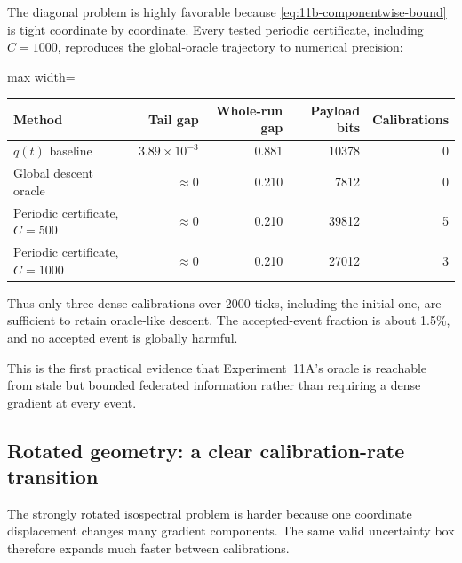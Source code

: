 The diagonal problem is highly favorable because \cref{eq:11b-componentwise-bound} is tight coordinate by coordinate. Every tested periodic certificate, including $C=1000$, reproduces the global-oracle trajectory to numerical precision:
\begin{center}
\begin{adjustbox}{max width=\textwidth}
\begin{tabular}{lrrrr}
\toprule
Method & Tail gap & Whole-run gap & Payload bits & Calibrations \\
\midrule
$q(t)$ baseline & $3.89\times10^{-3}$ & 0.881 & 10378 & 0 \\
Global descent oracle & $\approx0$ & 0.210 & 7812 & 0 \\
Periodic certificate, $C=500$ & $\approx0$ & 0.210 & 39812 & 5 \\
Periodic certificate, $C=1000$ & $\approx0$ & 0.210 & 27012 & 3 \\
\bottomrule
\end{tabular}
\end{adjustbox}
\end{center}
Thus only three dense calibrations over 2000 ticks, including the initial one, are sufficient to retain oracle-like descent. The accepted-event fraction is about 1.5\%, and no accepted event is globally harmful.

This is the first practical evidence that Experiment~11A's oracle is reachable from stale but bounded federated information rather than requiring a dense gradient at every event.

\subsection{Rotated geometry: a clear calibration-rate transition}

The strongly rotated isospectral problem is harder because one coordinate displacement changes many gradient components. The same valid uncertainty box therefore expands much faster between calibrations.

